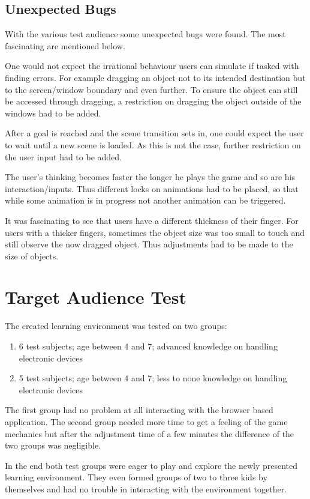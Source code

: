 \subsection{Unexpected Bugs}\label{subsec:unexpected-bugs}
With the various test audience some unexpected bugs were found. The most fascinating are mentioned below.

One would not expect the irrational behaviour users can simulate if tasked with finding errors.
For example dragging an object not to its intended destination but to the screen/window boundary and even further.
To ensure the object can still be accessed through dragging,
a restriction on dragging the object outside of the windows had to be added.

After a goal is reached and the scene transition sets in, one could expect the user to wait until a new scene is loaded.
As this is not the case, further restriction on the user input had to be added.

The user's thinking becomes faster the longer he plays the game and so are his interaction/inputs.
Thus different locks on animations had to be placed, so that while some animation is in progress not another animation can
be triggered.

It was fascinating to see that users have a different thickness of their finger.
For users with a thicker fingers, sometimes the object size was too small to touch and still observe the now dragged object.
Thus adjustments had to be made to the size of objects.

\section{Target Audience Test}\label{sec:target-audience-test}
The created learning environment was tested on two groups:
\begin{enumerate}
    \item 6 test subjects; age between 4 and 7; advanced knowledge on handling electronic devices
    \item 5 test subjects; age between 4 and 7; less to none knowledge on handling electronic devices
\end{enumerate}

The first group had no problem at all interacting with the browser based application.
The second group needed more time to get a feeling of the game mechanics but after the adjustment time of a few minutes
the difference of the two groups was negligible.

In the end both test groups were eager to play and explore the newly presented learning environment.
They even formed groups of two to three kids by themselves and had no trouble in interacting with the environment together.

